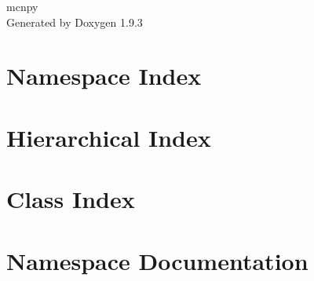 \documentclass[twoside]{book}
\newcommand{\+}{\discretionary{\mbox{\scriptsize$\hookleftarrow$}}{}{}}
\newcommand{\clearemptydoublepage}{%
    \newpage{\pagestyle{empty}\cleardoublepage}%
  }
\begin{document}
  \raggedbottom
    \hypersetup{pageanchor=false,
                bookmarksnumbered=true,
                pdfencoding=unicode
               }
  \begin{titlepage}
  \vspace*{7cm}
  \begin{center}%
  {\Large mcnpy}\\
  \vspace*{1cm}
  {\large Generated by Doxygen 1.9.3}\\
  \end{center}
  \end{titlepage}
  \clearemptydoublepage
  \tableofcontents
  \clearemptydoublepage
  \hypersetup{pageanchor=true}
\chapter{Namespace Index}

\chapter{Hierarchical Index}

\chapter{Class Index}

\chapter{Namespace Documentation}


\end{document}
